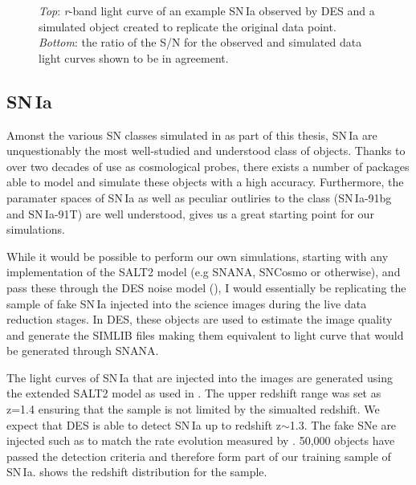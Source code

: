 \begin{figure}
  \caption{\textit{Top}: \textit{r}-band light curve of an example SN\,Ia observed by DES and a simulated object created to replicate the original data point. \textit{Bottom}: the ratio of the S/N for the observed and simulated data light curves shown to be in agreement.}
  \label{fig:IaNoiseComp}
\end{figure}

\subsection{SN\,Ia}
Amonst the various SN classes simulated in as part of this thesis, SN\,Ia are unquestionably the most well-studied and understood class of objects. Thanks to over two decades of use as cosmological probes, there exists a number of packages able to model and simulate these objects with a high accuracy. Furthermore, the paramater spaces of SN\,Ia as well as peculiar outliries to the class (SN\,Ia-91bg and SN\,Ia-91T) are well understood, gives us a great starting point for our simulations.

While it would be possible to perform our own simulations, starting with any implementation of the SALT2 model (e.g SNANA, SNCosmo or otherwise), and pass these through the DES noise model (), I would essentially be replicating the sample of fake SN\,Ia injected into the science images during the live data reduction stages. In DES, these objects are used to estimate the image quality and generate the \textsc{SIMLIB} files making them equivalent to light curve that would be generated through SNANA.

The light curves of SN\,Ia that are injected into the images are generated using the extended SALT2 model as used in \citet{Betoule2014}. The upper redshift range was set as z=1.4 ensuring that the sample is not limited by the simualted redshift. We expect that DES is able to detect SN\,Ia up to redshift z$\sim$1.3. The fake SNe are injected such as to match the rate evolution measured by \citet{Perrett2012}. 50,000 objects have passed the detection criteria and therefore form part of our training sample of SN\,Ia.  shows the redshift distribution for the sample.

